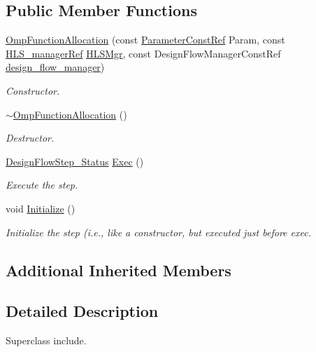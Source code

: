 \subsection*{Public Member Functions}
\begin{DoxyCompactItemize}
\item 
\hyperlink{classOmpFunctionAllocation_a60fa31e3348e0886cac71f857066ed54}{Omp\+Function\+Allocation} (const \hyperlink{Parameter_8hpp_a37841774a6fcb479b597fdf8955eb4ea}{Parameter\+Const\+Ref} Param, const \hyperlink{hls__manager_8hpp_acd3842b8589fe52c08fc0b2fcc813bfe}{H\+L\+S\+\_\+manager\+Ref} \hyperlink{classHLS__step_ade85003a99d34134418451ddc46a18e9}{H\+L\+S\+Mgr}, const Design\+Flow\+Manager\+Const\+Ref \hyperlink{classDesignFlowStep_ab770677ddf087613add30024e16a5554}{design\+\_\+flow\+\_\+manager})
\begin{DoxyCompactList}\small\item\em Constructor. \end{DoxyCompactList}\item 
\hyperlink{classOmpFunctionAllocation_a215e7a25eba97e9c22999006a7446e7e}{$\sim$\+Omp\+Function\+Allocation} ()
\begin{DoxyCompactList}\small\item\em Destructor. \end{DoxyCompactList}\item 
\hyperlink{design__flow__step_8hpp_afb1f0d73069c26076b8d31dbc8ebecdf}{Design\+Flow\+Step\+\_\+\+Status} \hyperlink{classOmpFunctionAllocation_a5ed037b259e632de3cad930b2b5cc8ef}{Exec} ()
\begin{DoxyCompactList}\small\item\em Execute the step. \end{DoxyCompactList}\item 
void \hyperlink{classOmpFunctionAllocation_a7ed35644fe18a1430f3bcf546bef1c1a}{Initialize} ()
\begin{DoxyCompactList}\small\item\em Initialize the step (i.\+e., like a constructor, but executed just before exec. \end{DoxyCompactList}\end{DoxyCompactItemize}
\subsection*{Additional Inherited Members}


\subsection{Detailed Description}
Superclass include. 

